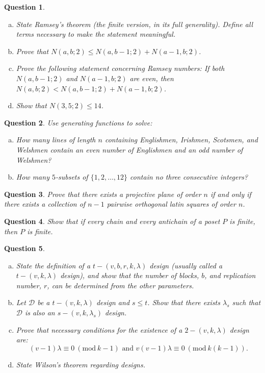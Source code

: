 \documentclass[12]{article}
\newcommand{\Mod}[1]{\ (\mathrm{mod}\ #1)}
\newtheorem{question}{Question}
\theoremstyle{definition}
\begin{document}
	\begin{question}
		\
		\begin{enumerate}[a)]
			\item State Ramsey's theorem (the finite version, in its full generality).  Define all terms necessary to make the statement meaningful.
			\item Prove that $N(a,b;2) \leq N(a,b-1;2) + N(a-1,b;2)$.
			\item Prove the following statement concerning Ramsey numbers: If both $N(a,b-1;2)$ and $N(a-1,b;2)$ are even, then $N(a,b;2) < N(a,b-1;2) + N(a-1,b;2)$.
			\item Show that $N(3,5;2) \leq 14$.
		\end{enumerate}
	\end{question}

	\begin{question}
		Use generating functions to solve:
		\begin{enumerate}[a)]
			\item How many lines of length $n$ containing Englishmen, Irishmen, Scotsmen, and Welshmen contain an even number of Englishmen and an odd number of Welshmen?
			\item How many $5$-subsets of $\{1, 2, \ldots, 12\}$ contain no three consecutive integers?
		\end{enumerate}
	\end{question}

	\begin{question}
		Prove that there exists a projective plane of order $n$ if and only if there exists a collection of $n-1$ pairwise orthogonal latin squares of order $n$.
	\end{question}

	\begin{question}
		Show that if every chain and every antichain of a poset $P$ is finite, then $P$ is finite.
	\end{question}

	\begin{question}
		\
		\begin{enumerate}[a)]
			\item State the definition of a $t-(v,b,r,k,\lambda)$ design (usually called a $t-(v,k,\lambda)$ design), and show that the number of blocks, $b$, and replication number, $r$, can be determined from the other parameters.
			\item Let $\mathcal{D}$ be a $t-(v,k,\lambda)$ design and $s \leq t$.  Show that there exists $\lambda_s$ such that $\mathcal{D}$ is also an $s-(v,k,\lambda_s)$ design.
			\item Prove that necessary conditions for the existence of a $2-(v,k,\lambda)$ design are:
			$$(v-1)\lambda \equiv 0 \Mod{k-1} \text{ and } v(v-1)\lambda \equiv 0 \Mod{k(k-1)}.$$
			\item State Wilson's theorem regarding designs.
		\end{enumerate}
	\end{question}
\end{document}
